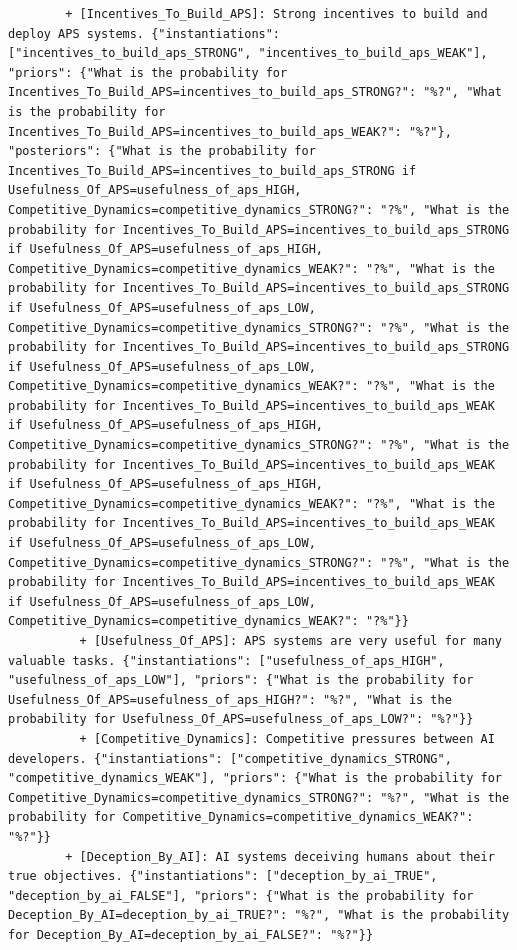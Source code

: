 \documentclass[
  11pt,
  letterpaper,
]{book}
\begin{document}
\begin{verbatim}
        + [Incentives_To_Build_APS]: Strong incentives to build and deploy APS systems. {"instantiations": ["incentives_to_build_aps_STRONG", "incentives_to_build_aps_WEAK"], "priors": {"What is the probability for Incentives_To_Build_APS=incentives_to_build_aps_STRONG?": "%?", "What is the probability for Incentives_To_Build_APS=incentives_to_build_aps_WEAK?": "%?"}, "posteriors": {"What is the probability for Incentives_To_Build_APS=incentives_to_build_aps_STRONG if Usefulness_Of_APS=usefulness_of_aps_HIGH, Competitive_Dynamics=competitive_dynamics_STRONG?": "?%", "What is the probability for Incentives_To_Build_APS=incentives_to_build_aps_STRONG if Usefulness_Of_APS=usefulness_of_aps_HIGH, Competitive_Dynamics=competitive_dynamics_WEAK?": "?%", "What is the probability for Incentives_To_Build_APS=incentives_to_build_aps_STRONG if Usefulness_Of_APS=usefulness_of_aps_LOW, Competitive_Dynamics=competitive_dynamics_STRONG?": "?%", "What is the probability for Incentives_To_Build_APS=incentives_to_build_aps_STRONG if Usefulness_Of_APS=usefulness_of_aps_LOW, Competitive_Dynamics=competitive_dynamics_WEAK?": "?%", "What is the probability for Incentives_To_Build_APS=incentives_to_build_aps_WEAK if Usefulness_Of_APS=usefulness_of_aps_HIGH, Competitive_Dynamics=competitive_dynamics_STRONG?": "?%", "What is the probability for Incentives_To_Build_APS=incentives_to_build_aps_WEAK if Usefulness_Of_APS=usefulness_of_aps_HIGH, Competitive_Dynamics=competitive_dynamics_WEAK?": "?%", "What is the probability for Incentives_To_Build_APS=incentives_to_build_aps_WEAK if Usefulness_Of_APS=usefulness_of_aps_LOW, Competitive_Dynamics=competitive_dynamics_STRONG?": "?%", "What is the probability for Incentives_To_Build_APS=incentives_to_build_aps_WEAK if Usefulness_Of_APS=usefulness_of_aps_LOW, Competitive_Dynamics=competitive_dynamics_WEAK?": "?%"}}
          + [Usefulness_Of_APS]: APS systems are very useful for many valuable tasks. {"instantiations": ["usefulness_of_aps_HIGH", "usefulness_of_aps_LOW"], "priors": {"What is the probability for Usefulness_Of_APS=usefulness_of_aps_HIGH?": "%?", "What is the probability for Usefulness_Of_APS=usefulness_of_aps_LOW?": "%?"}}
          + [Competitive_Dynamics]: Competitive pressures between AI developers. {"instantiations": ["competitive_dynamics_STRONG", "competitive_dynamics_WEAK"], "priors": {"What is the probability for Competitive_Dynamics=competitive_dynamics_STRONG?": "%?", "What is the probability for Competitive_Dynamics=competitive_dynamics_WEAK?": "%?"}}
        + [Deception_By_AI]: AI systems deceiving humans about their true objectives. {"instantiations": ["deception_by_ai_TRUE", "deception_by_ai_FALSE"], "priors": {"What is the probability for Deception_By_AI=deception_by_ai_TRUE?": "%?", "What is the probability for Deception_By_AI=deception_by_ai_FALSE?": "%?"}}

\end{verbatim}
\end{document}
